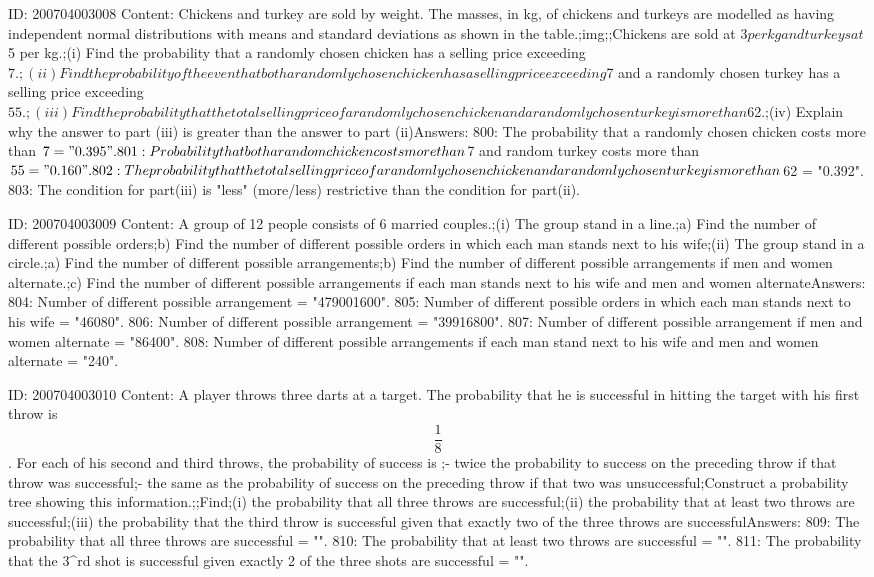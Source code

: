 \documentclass{article}
\begin{document}
ID: 200704003008
Content:
Chickens and turkey are sold by weight. The masses, in kg, of chickens and turkeys are modelled as having independent normal distributions with means and standard deviations as shown in the table.;img;;Chickens are sold at $3 per kg and turkeys at $5 per kg.;(i) Find the probability that a randomly chosen chicken has a selling price exceeding $7.;(ii) Find the probability of the even that both a randomly chosen chicken has a selling price exceeding $7 and a randomly chosen turkey has a selling price exceeding $55.;(iii) Find the probability that the total selling price of a randomly chosen chicken and a randomly chosen turkey is more than $62.;(iv) Explain why the answer to part (iii) is greater than the answer to part (ii)Answers:
800: The probability that a randomly chosen chicken costs more than $7 = "0.395".
801: Probability that both a random chicken costs more than $7 and random turkey costs more than $55 = "0.160".
802: The probability that the total selling price of a randomly chosen chicken and a randomly chosen turkey is more than $62 = "0.392".
803: The condition for part(iii) is "less" (more/less) restrictive than the condition for part(ii).

ID: 200704003009
Content:
A group of 12 people consists of 6 married couples.;(i) The group stand in a line.;a) Find the number of different possible orders;b) Find the number of different possible orders in which each man stands next to his wife;(ii) The group stand in a circle.;a) Find the number of different possible arrangements;b) Find the number of different possible arrangements if men and women alternate.;c) Find the number of different possible arrangements if each man stands next to his wife and men and women alternateAnswers:
804: Number of different possible arrangement = "479001600".
805: Number of different possible orders in which each man stands next to his wife = "46080".
806: Number of different possible arrangement = "39916800".
807: Number of different possible arrangement if men and women alternate = "86400".
808: Number of different possible arrangements if each man stand next to his wife and men and women alternate = "240".

ID: 200704003010
Content:
A player throws three darts at a target. The probability that he is successful in hitting the target with his first throw is $$\frac{1}{8}$$. For each of his second and third throws, the probability of success is ;- twice the probability to success on the preceding throw if that throw was successful;- the same as the probability of success on the preceding throw if that two was unsuccessful;Construct a probability tree showing this information.;;Find;(i) the probability that all three throws are successful;(ii) the probability that at least two throws are successful;(iii) the probability that the third throw is successful given that exactly two of the three throws are successfulAnswers:
809: The probability that all three throws are successful = "".
810: The probability that at least two throws are successful = "".
811: The probability that the 3^{rd} shot is successful given exactly 2 of the three shots are successful = "".
\end{document}
